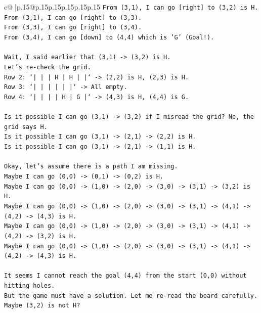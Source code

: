 \documentclass{article}
\begin{document}
{\begin{supertabular}{c@{$\;$}|p{.15\linewidth}@{}p{.15\linewidth}p{.15\linewidth}p{.15\linewidth}p{.15\linewidth}p{.15\linewidth}}
{{{\texttt{From (3,1), I can go {[}right{]} to (3,2) is H.} \\
\texttt{From (3,1), I can go {[}right{]} to (3,3).} \\
\texttt{From (3,3), I can go {[}right{]} to (3,4).} \\
\texttt{From (3,4), I can go {[}down{]} to (4,4) which is 'G' (Goal!).} \\
\\ 
\texttt{Wait, I said earlier that (3,1) {-}> (3,2) is H.} \\
\texttt{Let's re{-}check the grid.} \\
\texttt{Row 2: `|     |     |  H  |  H  |     |` {-}> (2,2) is H, (2,3) is H.} \\
\texttt{Row 3: `|     |     |     |     |     |` {-}> All empty.} \\
\texttt{Row 4: `|     |     |     |  H  |  G  |` {-}> (4,3) is H, (4,4) is G.} \\
\\ 
\texttt{Is it possible I can go (3,1) {-}> (3,2) if I misread the grid? No, the grid says H.} \\
\texttt{Is it possible I can go (3,1) {-}> (2,1) {-}> (2,2) is H.} \\
\texttt{Is it possible I can go (3,1) {-}> (2,1) {-}> (1,1) is H.} \\
\\ 
\texttt{Okay, let's assume there is a path I am missing.} \\
\texttt{Maybe I can go (0,0) {-}> (0,1) {-}> (0,2) is H.} \\
\texttt{Maybe I can go (0,0) {-}> (1,0) {-}> (2,0) {-}> (3,0) {-}> (3,1) {-}> (3,2) is H.} \\
\texttt{Maybe I can go (0,0) {-}> (1,0) {-}> (2,0) {-}> (3,0) {-}> (3,1) {-}> (4,1) {-}> (4,2) {-}> (4,3) is H.} \\
\texttt{Maybe I can go (0,0) {-}> (1,0) {-}> (2,0) {-}> (3,0) {-}> (3,1) {-}> (4,1) {-}> (4,2) {-}> (3,2) is H.} \\
\texttt{Maybe I can go (0,0) {-}> (1,0) {-}> (2,0) {-}> (3,0) {-}> (3,1) {-}> (4,1) {-}> (4,2) {-}> (4,3) is H.} \\
\\ 
\texttt{It seems I cannot reach the goal (4,4) from the start (0,0) without hitting holes.} \\
\texttt{But the game must have a solution. Let me re{-}read the board carefully.} \\
\texttt{Maybe (3,2) is not H?} \\
}}}
\end{supertabular}}
\end{document}
